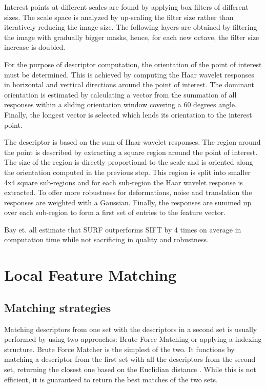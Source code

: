 \documentclass{l4proj}
\begin{document}
Interest points at different scales are found by applying box filters of different sizes. The scale space is analyzed by up-scaling the filter size rather than iteratively reducing the image size. The following layers are obtained by filtering the image with gradually bigger masks, hence, for each new octave, the filter size increase is doubled. 

For the purpose of descriptor computation, the orientation of the point of interest must be determined. This is achieved by computing the Haar wavelet responses in horizontal and vertical directions around the point of interest. The dominant orientation is estimated by calculating a vector from the summation of all responses within a sliding orientation window covering a 60 degrees angle. Finally, the longest vector is selected which lends its orientation to the interest point. 

The descriptor is based on the sum of Haar wavelet responses. The region around the point is described by extracting a square region around the point of interest. The size of the region is directly proportional to the scale and is oriented along the orientation computed in the previous step. This region is split into smaller 4x4 square sub-regions and for each sub-region the Haar wavelet response is extracted. To offer more robustness for deformations, noise and translation the responses are weighted with a Gaussian. Finally, the responses are summed up over each sub-region to form a first set of entries to the feature vector. 

Bay et. all estimate that SURF outperforms SIFT by 4 times on average in computation time while not sacrificing in quality and robustness.

\section{Local Feature Matching}

\subsection{Matching strategies}
Matching descriptors from one set with the descriptors in a second set is usually performed by using two approaches: Brute Force Matching or applying a indexing structure. Brute Force Matcher is the simplest of the two. It functions by matching a descriptor from the first set with all the descriptors from the second set, returning the closest one based on the Euclidian distance \citep{Lowe04}. While this is not efficient, it is guaranteed to return the best matches of the two sets. 
\end{document}
